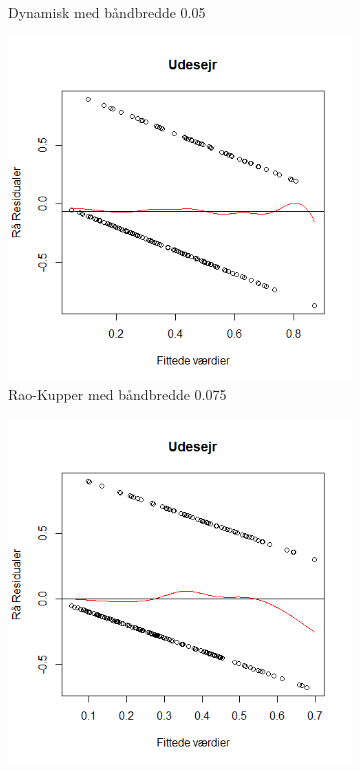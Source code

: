 \documentclass[11pt,a4paper]{article}
\begin{document}
\begin{figure}[h!]
\begin{subfigure}[b]{0.425\linewidth}
    \caption{Dynamisk med båndbredde 0.05}
    \label{fig:ResDHS}
  \end{subfigure}
  \begin{subfigure}[b]{0.425\linewidth}
    \includegraphics[width=\linewidth]{ResSUS.png}
    \caption{Rao-Kupper med båndbredde 0.075}
    \label{fig:ResSUS}
  \end{subfigure}
  \begin{subfigure}[b]{0.425\linewidth}
    \includegraphics[width=\linewidth]{ResDUS.png}

\end{subfigure}
\end{figure}
\end{document}
